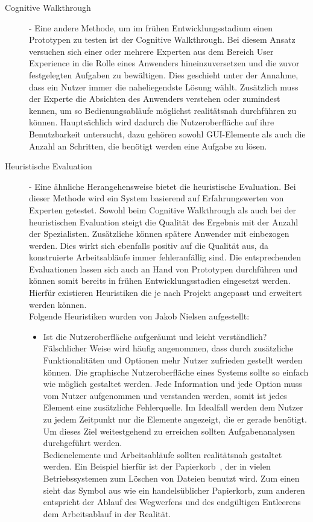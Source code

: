 \begin{description}
\item[Cognitive Walkthrough] 
 - Eine andere Methode, um im frühen Entwicklungsstadium einen Prototypen zu testen ist der Cognitive Walkthrough. Bei diesem Ansatz versuchen sich einer oder mehrere Experten aus dem Bereich User Experience in die Rolle eines Anwenders hineinzuversetzen und die zuvor festgelegten Aufgaben zu bewältigen. Dies geschieht unter der Annahme, dass ein Nutzer immer die naheliegendste Lösung wählt. Zusätzlich muss der Experte die Absichten des Anwenders verstehen oder zumindest kennen, um so Bedienungsabläufe möglichst realitätsnah durchführen zu können. Hauptsächlich wird dadurch die Nutzeroberfläche auf ihre Benutzbarkeit untersucht, dazu gehören sowohl GUI-Elemente als auch die Anzahl an Schritten, die benötigt werden eine Aufgabe zu lösen. \cite[S. 234f.]{Moser:2012cn}
\item[Heuristische Evaluation] 
 - Eine ähnliche Herangehensweise bietet die heuristische Evaluation. Bei dieser Methode wird ein System basierend auf Erfahrungswerten von Experten getestet. Sowohl beim Cognitive Walkthrough als auch bei der heuristischen Evaluation steigt die Qualität des Ergebnis mit der Anzahl der Spezialisten. Zusätzliche können spätere Anwender mit einbezogen werden. Dies wirkt sich ebenfalls positiv auf die Qualität aus, da konstruierte Arbeitsabläufe immer fehleranfällig sind. Die entsprechenden Evaluationen lassen sich auch an Hand von Prototypen durchführen und können somit bereits in frühen Entwicklungsstadien eingesetzt werden. Hierfür existieren Heuristiken die je nach Projekt angepasst und erweitert werden können. \cite[S. 232f.]{Moser:2012cn}\\
Folgende Heuristiken wurden von Jakob Nielsen aufgestellt:
\begin{itemize}
\item Ist die Nutzeroberfläche aufgeräumt und leicht verständlich?\\
Fälschlicher Weise wird häufig angenommen, dass durch zusätzliche Funktionalitäten und Optionen mehr Nutzer zufrieden gestellt werden können. Die graphische Nutzeroberfläche eines Systems sollte so einfach wie möglich gestaltet werden. Jede Information und jede Option muss vom Nutzer aufgenommen und verstanden werden, somit ist jedes Element eine zusätzliche Fehlerquelle. Im Idealfall werden dem Nutzer zu jedem Zeitpunkt nur die Elemente angezeigt, die er gerade benötigt. Um dieses Ziel weitestgehend zu erreichen sollten Aufgabenanalysen durchgeführt werden.\\
Bedienelemente und Arbeitsabläufe sollten realitätsnah gestaltet werden. Ein Beispiel hierfür ist der \glqq Papierkorb\grqq\ , der in vielen Betriebssystemen zum Löschen von Dateien benutzt wird. Zum einen sieht das Symbol aus wie ein handelsüblicher Papierkorb, zum anderen entspricht der Ablauf des Wegwerfens und des endgültigen Entleerens dem Arbeitsablauf in der Realität.\\

\end{itemize}
\end{description}

